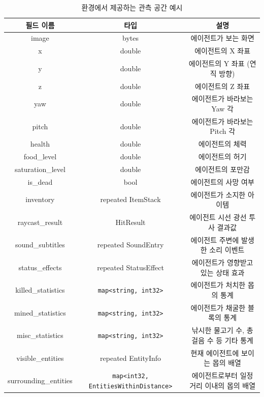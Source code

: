\documentclass[oneside, under, ko]{snuthesis}
\begin{document}
\begin{table}
    \centering
    \renewcommand{\arraystretch}{1.5} %
\begin{tabular}{|c|c|c|}
    \hline
    \textbf{필드 이름} & \textbf{타입} & \textbf{설명} \\
    \hline
    image & bytes & 에이전트가 보는 화면 \\
    \hline
    x & double & 에이전트의 X 좌표 \\
    \hline
    y & double & 에이전트의 Y 좌표 (연직 방향) \\
    \hline
    z & double & 에이전트의 Z 좌표 \\
    \hline
    yaw & double & 에이전트가 바라보는 Yaw 각 \\
    \hline
    pitch & double & 에이전트가 바라보는 Pitch 각 \\
    \hline
    health & double & 에이전트의 체력 \\
    \hline
    food\_level & double & 에이전트의 허기  \\
    \hline
    saturation\_level & double & 에이전트의 포만감 \\
    \hline
    is\_dead & bool & 에이전트의 사망 여부 \\
    \hline
    inventory & repeated ItemStack & 에이전트가 소지한 아이템 \\
    \hline
    raycast\_result & HitResult & 에이전트 시선 광선 투사 결과값 \\
    \hline
    sound\_subtitles & repeated SoundEntry & 에이전트 주변에 발생한 소리 이벤트 \\
    \hline
    status\_effects & repeated StatusEffect & 에이전트가 영향받고 있는 상태 효과 \\
    \hline
    killed\_statistics & \texttt{map<string, int32>} & 에이전트가 처치한 몹의 통계 \\
    \hline
    mined\_statistics & \texttt{map<string, int32>} & 에이전트가 채굴한 블록의 통계 \\
    \hline
    misc\_statistics & \texttt{map<string, int32>} & 낚시한 물고기 수, 총 걸음 수 등 기타 통계 \\
    \hline
    visible\_entities & repeated EntityInfo & 현재 에이전트에 보이는 몹의 배열 \\
    \hline
    surrounding\_entities & \texttt{map<int32, EntitiesWithinDistance>} & 에이전트로부터 일정 거리 이내의 몹의 배열 \\
    \hline
\end{tabular}
\caption{환경에서 제공하는 관측 공간 예시}
\label{tab:observation_space}
\end{table}
\end{document}
